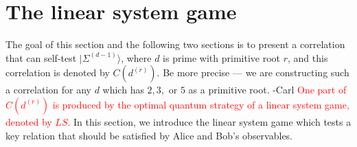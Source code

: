 \documentclass[11pt,letterpaper]{article}
\newcommand{\ket}[1]{|#1\rangle}
\DeclarePairedDelimiter{\set}{\lbrace}{\rbrace}
\DeclarePairedDelimiter{\ip}{\langle}{\rangle}
\newcommand{\Z}{\mathbb{Z}}
\newcommand{\1}{\mathbb{1}}
\newcommand{\J}{\mathcal{J}}
\newcommand{\EPR}[1]{\Sigma^{(#1)}}
\newcommand{\LS}{LS}
\newcommand{\dr}[1]{d^{(#1)}}
\def\carl#1{{\color{blue} #1 -Carl}}
\newcommand{\hf}[1]{\textcolor{red}{#1}}
\newtheorem{definition}[theorem]{Definition}
\theoremstyle{definition}
\begin{document}


\section{The linear system game}
\label{sec:lsg}
The goal of this section and the following two sections is to 
present a correlation that can self-test $\ket{\EPR{d-1}}$, 
where $d$ is prime with primitive root $r$,
and this correlation is denoted by $C(\dr{r})$.  \carl{Be more precise --- we are constructing
such a correlation for any $d$ which has $2, 3,$ or $5$ as a primitive root.}
\hf{One part of $C(\dr{r})$ is produced by the optimal quantum strategy of a linear system game, denoted by $\LS$.}
In this section, we introduce the linear system game which tests a key relation that should be satisfied by 
Alice and Bob's observables.
\end{document}
